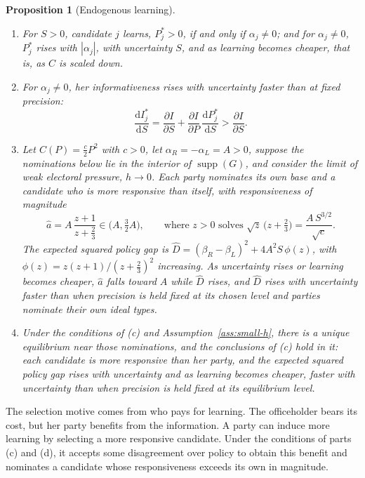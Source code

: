 \documentclass[12pt,letterpaper]{article}
\newtheorem{proposition}{Proposition}
\begin{document}
\begin{proposition}[Endogenous learning]\label{prop:endolearn}
\begin{enumerate}
  \item[(a)] For $S>0$, candidate $j$ learns, $P_j^*>0$, if and only if $\alpha_j\ne0$; and for $\alpha_j\ne0$, $P_j^*$ rises with $|\alpha_j|$, with uncertainty $S$, and as learning becomes cheaper, that is, as $C$ is scaled down.
  \item[(b)] For $\alpha_j\ne0$, her informativeness rises with uncertainty faster than at fixed precision:
  \[
  \frac{\mathrm{d}I_j^*}{\mathrm{d}S}=\frac{\partial I}{\partial S}+\frac{\partial I}{\partial P}\,\frac{\mathrm{d}P_j^*}{\mathrm{d}S}>\frac{\partial I}{\partial S}.
  \]
  \item[(c)] Let $C(P)=\tfrac c2P^2$ with $c>0$, let $\alpha_R=-\alpha_L=A>0$, suppose the nominations below lie in the interior of $\operatorname{supp}(G)$, and consider the limit of weak electoral pressure, $h\to0$. Each party nominates its own base and a candidate who is more responsive than itself, with responsiveness of magnitude
  \[
  \widehat a=A\,\frac{z+1}{z+\tfrac23}\in\Big(A,\tfrac32A\Big),
  \qquad\text{where }z>0\text{ solves }\sqrt z\,\big(z+\tfrac23\big)=\frac{A\,S^{3/2}}{\sqrt c}.
  \]
  The expected squared policy gap is $\widehat D=(\beta_R-\beta_L)^2+4A^2S\,\phi(z)$, with $\phi(z)=z(z+1)/(z+\tfrac23)^2$ increasing. As uncertainty rises or learning becomes cheaper, $\widehat a$ falls toward $A$ while $\widehat D$ rises, and $\widehat D$ rises with uncertainty faster than when precision is held fixed at its chosen level and parties nominate their own ideal types.
  \item[(d)] Under the conditions of (c) and Assumption~\ref{ass:small-h}, there is a unique equilibrium near those nominations, and the conclusions of (c) hold in it: each candidate is more responsive than her party, and the expected squared policy gap rises with uncertainty and as learning becomes cheaper, faster with uncertainty than when precision is held fixed at its equilibrium level.
\end{enumerate}
\end{proposition}

The selection motive comes from who pays for learning. The officeholder bears its cost, but her party benefits from the information. A party can induce more learning by selecting a more responsive candidate. Under the conditions of parts (c) and (d), it accepts some disagreement over policy to obtain this benefit and nominates a candidate whose responsiveness exceeds its own in magnitude.
\end{document}
